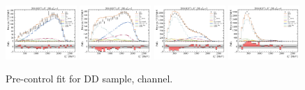\begin{figure}[htb]
    \includegraphics[width=0.24\textwidth]{./figs-supplemental-plots/pre-ctrl-fit/lines_q2_slices/fit_result-lines_q2_idx1-Dst-dd-el.pdf}
    \includegraphics[width=0.24\textwidth]{./figs-supplemental-plots/pre-ctrl-fit/lines_q2_slices/fit_result-lines_q2_idx2-Dst-dd-el.pdf}
    \includegraphics[width=0.24\textwidth]{./figs-supplemental-plots/pre-ctrl-fit/lines_q2_slices/fit_result-lines_q2_idx3-Dst-dd-el.pdf}
    \includegraphics[width=0.24\textwidth]{./figs-supplemental-plots/pre-ctrl-fit/lines_q2_slices/fit_result-lines_q2_idx4-Dst-dd-el.pdf}

    \caption{Pre-control fit for DD sample, \Dstar channel.}
    \label{fig:pre-ctrl-dd-dst}
\end{figure}
